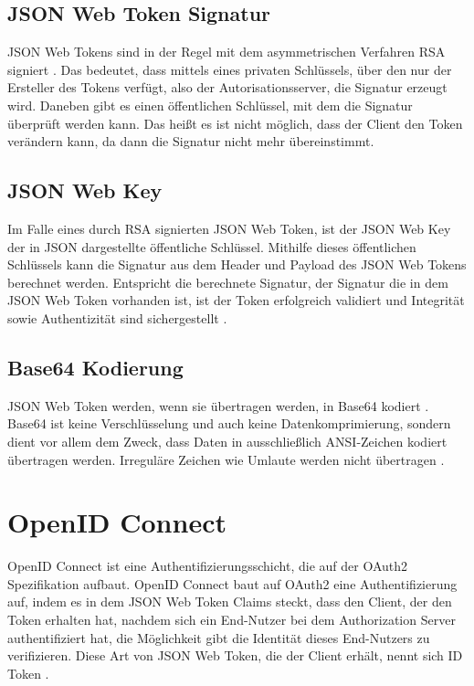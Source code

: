 \subsection{JSON Web Token Signatur}
\label{sec:JSONWebToken:JSONWebTokenSignatur}

JSON Web Tokens sind in der Regel mit dem asymmetrischen Verfahren \ac{RSA} signiert \citep{jwt:2015}. Das bedeutet, dass mittels eines privaten Schlüssels, über den
nur der Ersteller des Tokens verfügt, also der Autorisationsserver, die Signatur erzeugt wird.
Daneben gibt es einen öffentlichen Schlüssel, mit dem die Signatur überprüft werden kann.
Das heißt es ist nicht möglich, dass der Client den Token verändern kann, da dann die
Signatur nicht mehr übereinstimmt.

\subsection{JSON Web Key}
\label{sec:JSONWebToken:JSONWebKey}
Im Falle eines durch RSA signierten JSON Web Token, ist der JSON Web Key der in JSON dargestellte öffentliche Schlüssel. Mithilfe dieses öffentlichen Schlüssels kann die Signatur aus dem Header und Payload des JSON Web Tokens berechnet werden. Entspricht die berechnete Signatur, der Signatur die in dem JSON Web Token vorhanden ist, ist der Token erfolgreich validiert und Integrität sowie Authentizität sind sichergestellt \citep{jwk:2015}.

\subsection{Base64 Kodierung}
\label{sec:JSONWebToken:Base64Kodierung}
JSON Web Token werden, wenn sie übertragen werden, in Base64 kodiert \citep{jwt:2015}. Base64 ist
keine Verschlüsselung und auch keine Datenkomprimierung, sondern dient vor allem dem
Zweck, dass Daten in ausschließlich ANSI-Zeichen kodiert übertragen werden. Irreguläre Zeichen wie Umlaute werden nicht übertragen \citep{base64:2006}. 

\section{OpenID Connect}
\label{sec:OpenIDConnect}
OpenID Connect ist eine Authentifizierungsschicht, die auf der OAuth2 Spezifikation
aufbaut. OpenID Connect baut auf OAuth2 eine Authentifizierung auf, indem es in dem JSON Web Token
Claims steckt, dass den Client, der den Token erhalten hat, nachdem sich ein End-Nutzer bei
dem Authorization Server authentifiziert hat, die Möglichkeit gibt die Identität dieses End-Nutzers zu verifizieren.
Diese Art von JSON Web Token, die der Client erhält, nennt sich ID Token \citep{openidconnect:2014}. 

